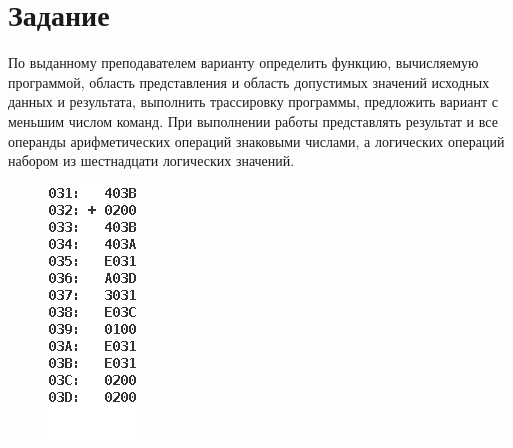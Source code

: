 \documentclass[11pt,a4paper]{article}
\begin{document}
	\section{Задание}
		По выданному преподавателем варианту определить функцию, вычисляемую программой, область представления и область допустимых значений исходных данных и результата, выполнить трассировку программы, предложить вариант с меньшим числом команд. При выполнении работы представлять результат и все операнды арифметических операций знаковыми числами, а логических операций набором из шестнадцати логических значений.
		\begin{figure}[H]
			\includegraphics[scale=0.7]{../task.png}
		\end{figure}
\end{document}
